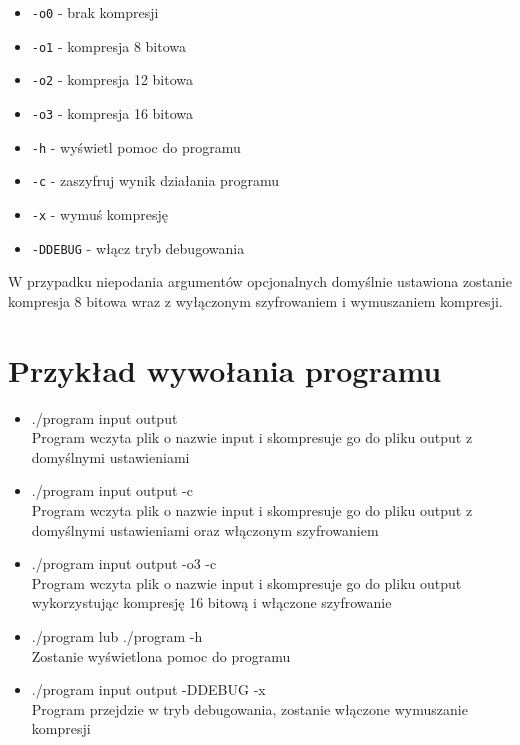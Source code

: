 \documentclass[]{article}
\begin{document}
\begin{itemize}
\item
  \texttt{-o0} - brak kompresji
\item
   \texttt{-o1} - kompresja 8 bitowa
\item
   \texttt{-o2} - kompresja 12 bitowa
\item
   \texttt{-o3} - kompresja 16 bitowa
\item
 \texttt{-h} - wyświetl pomoc do programu
\item
 \texttt{-c} - zaszyfruj wynik działania programu
\item
 \texttt{-x} - wymuś kompresję
\item
 \texttt{-DDEBUG} - włącz tryb debugowania
\end{itemize}
W przypadku niepodania argumentów opcjonalnych domyślnie ustawiona zostanie kompresja 8 bitowa wraz z wyłączonym szyfrowaniem i wymuszaniem kompresji.

\section{Przykład wywołania programu}\label{header-n233}

\begin{itemize}
\item
 ./program input output
\\Program wczyta plik o nazwie input i skompresuje go do pliku output z domyślnymi ustawieniami
\item
 ./program input output -c
\\Program wczyta plik o nazwie input i skompresuje go do pliku output z domyślnymi ustawieniami oraz włączonym szyfrowaniem
\item
 ./program input output -o3 -c
\\Program wczyta plik o nazwie input i skompresuje go do pliku output wykorzystując kompresję 16 bitową i włączone szyfrowanie 
\item
 ./program lub ./program -h
\\Zostanie wyświetlona pomoc do programu
\item
 ./program input output -DDEBUG -x
\\Program przejdzie w tryb debugowania, zostanie włączone wymuszanie kompresji

\end{itemize}
\end{document}
